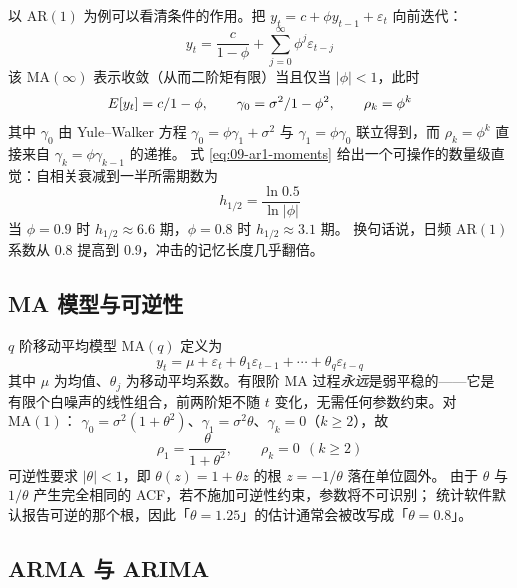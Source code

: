 以 $\mathrm{AR}(1)$ 为例可以看清条件的作用。把 $y_t=c+\phi y_{t-1}+\varepsilon_t$ 向前迭代：
\begin{equation}\label{eq:09-ar1-ma}
  y_t=\frac{c}{1-\phi}+\sum_{j=0}^{\infty}\phi^{j}\varepsilon_{t-j}
\end{equation}
该 $\mathrm{MA}(\infty)$ 表示收敛（从而二阶矩有限）当且仅当 $|\phi|<1$，此时
\begin{equation}\label{eq:09-ar1-moments}
  E[y_t]=c/1-\phi,\qquad
  \gamma_0=\sigma^2/1-\phi^2,\qquad
  \rho_k=\phi^{k}
\end{equation}
其中 $\gamma_0$ 由 Yule--Walker 方程 $\gamma_0=\phi\gamma_1+\sigma^2$ 与 $\gamma_1=\phi\gamma_0$
联立得到，而 $\rho_k=\phi^k$ 直接来自 $\gamma_k=\phi\gamma_{k-1}$ 的递推。
式 \eqref{eq:09-ar1-moments} 给出一个可操作的数量级直觉：自相关衰减到一半所需期数为
\begin{equation}\label{eq:09-halflife-ar}
  h_{1/2}=\frac{\ln 0.5}{\ln|\phi|}
\end{equation}
当 $\phi=0.9$ 时 $h_{1/2}\approx 6.6$ 期，$\phi=0.8$ 时 $h_{1/2}\approx 3.1$ 期。
换句话说，日频 $\mathrm{AR}(1)$ 系数从 0.8 提高到 0.9，冲击的记忆长度几乎翻倍。

\subsection{MA 模型与可逆性}

$q$ 阶移动平均模型 $\mathrm{MA}(q)$ 定义为
\begin{equation}\label{eq:09-ma}
  y_t=\mu+\varepsilon_t+\theta_1\varepsilon_{t-1}+\cdots+\theta_q\varepsilon_{t-q}
\end{equation}
其中 $\mu$ 为均值、$\theta_j$ 为移动平均系数。有限阶 MA 过程\emph{永远}是弱平稳的——它是
有限个白噪声的线性组合，前两阶矩不随 $t$ 变化，无需任何参数约束。对 $\mathrm{MA}(1)$：
$\gamma_0=\sigma^2(1+\theta^2)$、$\gamma_1=\sigma^2\theta$、$\gamma_k=0$（$k\ge 2$），故
\begin{equation}\label{eq:09-ma1-acf}
  \rho_1=\frac{\theta}{1+\theta^2},\qquad \rho_k=0\ \ (k\ge 2)
\end{equation}
可逆性要求 $|\theta|<1$，即 $\theta(z)=1+\theta z$ 的根 $z=-1/\theta$ 落在单位圆外。
由于 $\theta$ 与 $1/\theta$ 产生完全相同的 ACF，若不施加可逆性约束，参数将不可识别；
统计软件默认报告可逆的那个根，因此「$\theta=1.25$」的估计通常会被改写成「$\theta=0.8$」。

\subsection{ARMA 与 ARIMA}

